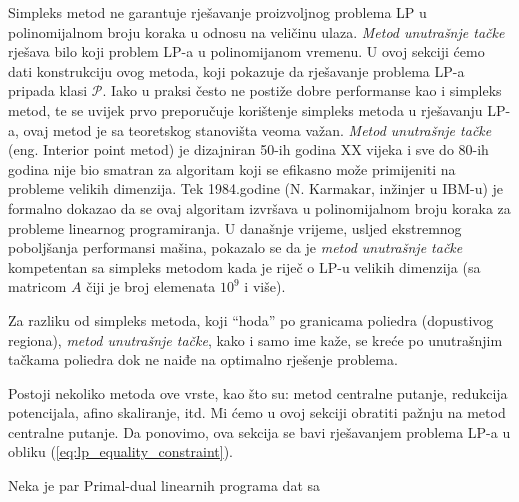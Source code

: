 \documentclass[a4paper, utf8, 11pt, colorlinks]{book}
\begin{document}
Simpleks metod ne garantuje   rješavanje proizvoljnog problema LP u polinomijalnom broju koraka u odnosu na veličinu ulaza. %
\emph{Metod unutrašnje tačke} rješava bilo koji problem LP-a  u polinomijanom vremenu. U ovoj sekciji ćemo dati konstrukciju ovog metoda, koji pokazuje da rješavanje problema LP-a pripada klasi $\mathcal{P}$. Iako u praksi često ne postiže dobre  performanse kao i simpleks metod, te se uvijek prvo preporučuje korištenje simpleks metoda u rješavanju LP-a, ovaj metod je sa teoretskog stanovišta veoma važan.  \emph{Metod unutrašnje tačke} (eng. Interior point metod) je dizajniran 50-ih godina XX vijeka i sve do 80-ih godina nije bio smatran za algoritam koji se efikasno može primijeniti na probleme velikih dimenzija. Tek 1984.godine (N. Karmakar, inžinjer u IBM-u) je formalno dokazao da se ovaj algoritam izvršava u polinomijalnom broju koraka za probleme linearnog programiranja. U današnje vrijeme, usljed ekstremnog poboljšanja performansi mašina, pokazalo se da je \emph{metod unutrašnje tačke} kompetentan sa simpleks metodom kada je riječ o LP-u velikih dimenzija (sa matricom $A$ čiji je broj elemenata $10^9$ i više).

Za razliku od simpleks metoda, koji ``hoda'' po granicama poliedra (dopustivog regiona), \emph{metod unutrašnje tačke}, kako i samo ime kaže, se kreće po unutrašnjim tačkama poliedra  dok ne naiđe na optimalno rješenje problema. 

Postoji nekoliko metoda ove vrste, kao što su: metod centralne putanje, redukcija potencijala, afino skaliranje, itd. Mi ćemo u ovoj sekciji obratiti pažnju na metod centralne putanje. Da ponovimo, ova sekcija se bavi rješavanjem problema LP-a u obliku (\ref{eq:lp_equality_constraint}). 

Neka je par Primal-dual linearnih programa dat sa
\end{document}
